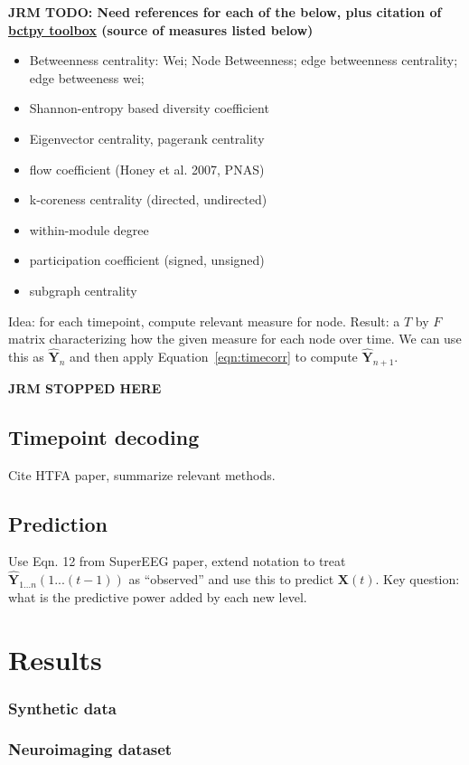 \documentclass[english]{article}
\begin{document}
\textbf{JRM TODO: Need references for each of the below, plus citation
  of \href{https://github.com/aestrivex/bctpy/wiki}{bctpy toolbox} (source of measures listed below)}
\begin{itemize}
\item Betweenness centrality: Wei; Node Betweenness; edge betweenness
  centrality; edge betweeness wei; 
\item Shannon-entropy based diversity coefficient
\item Eigenvector centrality, pagerank centrality
\item flow coefficient (Honey et al. 2007, PNAS)
\item k-coreness centrality (directed, undirected)
\item within-module degree
\item participation coefficient (signed, unsigned)
\item subgraph centrality
\end{itemize}

Idea: for each timepoint, compute relevant measure for node.  Result:
a $T$ by $F$ matrix characterizing how the given measure for each node
over time.  We can use this as $\hat{\mathbf{Y}}_n$ and then apply
Equation~\ref{eqn:timecorr} to compute $\hat{\mathbf{Y}}_{n+1}.$

\textbf{JRM STOPPED HERE}

\subsection*{Timepoint decoding}
Cite HTFA paper, summarize relevant methods.

\subsection*{Prediction}
Use Eqn. 12 from SuperEEG paper, extend notation to treat
$\hat{\mathbf{Y}}_{1...n}(1...(t-1))$ as ``observed'' and use this to
predict $\mathbf{X}(t)$.  Key question: what is the predictive power
added by each new level.

\section*{Results}
\subsubsection*{Synthetic data}
\subsubsection*{Neuroimaging dataset~\citep{SimoEtal16}}
\end{document}
